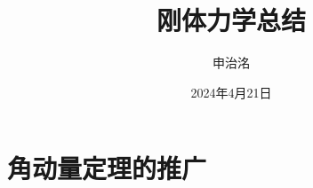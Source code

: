 \documentclass{ctexart}
\title{刚体力学总结}
\author{申治洺}
\date{2024年4月21日}
\begin{document}
    \maketitle
    
    \section{角动量定理的推广}\label{sec:1}
\end{document}
